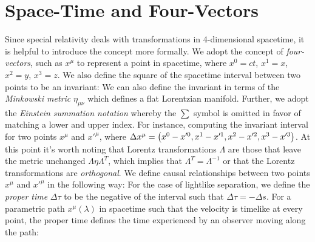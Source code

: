 \section{Space-Time and Four-Vectors}
Since special relativity deals with transformations in 4-dimensional spacetime, it is helpful to introduce the concept more formally. We adopt the concept of \textit{four-vectors}, such as $x^\mu$ to represent a point in spacetime, where $x^0=ct$, $x^1=x$, $x^2=y$, $x^3=z$. We also define the square of the spacetime interval between two points to be an invariant:
We can also define the invariant in terms of the \textit{Minkowski metric} $\eta_{\mu\nu}$ which defines a flat Lorentzian manifold. Further, we adopt the \textit{Einstein summation notation} whereby the $\sum$ symbol is omitted in favor of matching a lower and upper index. For instance, computing the invariant interval for two points $x^\mu$ and $x'^\mu$, where $\Delta x^\mu = \left(x^0-x'^0, x^1-x'^1, x^2-x'^2, x^3-x'^3\right)$.
At this point it's worth noting that Lorentz transformations $\Lambda$ are those that leave the metric unchanged $\Lambda \eta \Lambda^{T}$, which implies that $\Lambda^T = \Lambda^{-1}$ or that the Lorentz transformations are \textit{orthogonal}. We define causal relationships between two points $x^\mu$ and $x'^\mu$ in the following way:
For the case of lightlike separation, we define the \textit{proper time} $\Delta \tau$ to be the negative of the interval such that $\Delta \tau = - \Delta s$. For a parametric path $x^\mu(\lambda)$ in spacetime such that the velocity is timelike at every point, the proper time defines the time experienced by an observer moving along the path:


